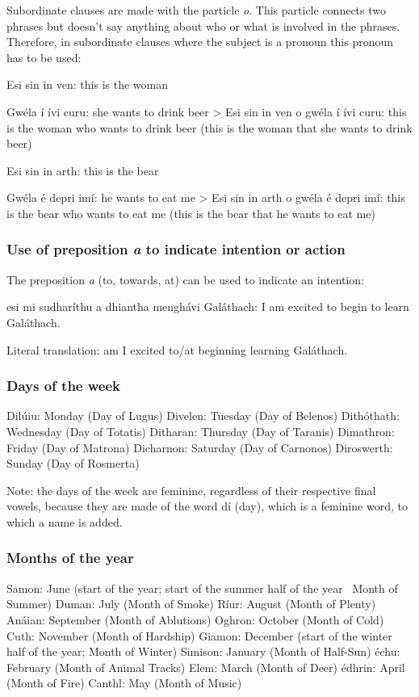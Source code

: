Subordinate clauses are made with the particle \textit{o}. This particle connects two phrases but doesn't say anything about who or what is involved in the phrases. Therefore, in subordinate clauses where the subject is a pronoun this pronoun has to be used:

Esi sin in ven: this is the woman

Gw\'{e}la \'{i} \'{i}vi curu: she wants to drink beer
> Esi sin in ven o gw\'{e}la \'{i} \'{i}vi curu: this is the woman who wants to drink beer (this is the woman that she wants to drink beer)

Esi sin in arth: this is the bear

Gw\'{e}la \'{e} depri im\'{i}: he wants to eat me
> Esi sin in arth o gw\'{e}la \'{e} depri im\'{i}: this is the bear who wants to eat me (this is the bear that he wants to eat me)

\subsubsection{Use of preposition \textit{a} to indicate intention or action}

The preposition \textit{a} (to, towards, at) can be used to indicate an intention:

esi mi sudhar\'{i}thu a dhiantha mengh\'{a}vi Gal\'{a}thach: I am excited to begin to learn Gal\'{a}thach.

Literal translation: am I excited to/at beginning learning Gal\'{a}thach.

\subsubsection{Days of the week}

Dil\'{u}iu: Monday (Day of Lugus)
Divelen: Tuesday (Day of Belenos)
Dith\'{o}thath: Wednesday (Day of Totatis)
Ditharan: Thursday (Day of Taranis)
Dimathron: Friday (Day of Matrona)
Dicharnon: Saturday (Day of Carnonos)
Diroswerth: Sunday (Day of Rosmerta)

Note: the days of the week are feminine, regardless of their respective final vowels, because they are made of the word d\'{i} (day), which is a feminine word, to which a name is added.

\subsubsection{Months of the year}

Samon: June (start of the year; start of the summer half of the year \textendash\ Month of Summer)
Duman: July (Month of Smoke)
R\'{i}ur: August (Month of Plenty)
An\'{a}ian: September (Month of Ablutions)
Oghron: October (Month of Cold)
Cuth: November (Month of Hardship)
Giamon: December (start of the winter half of the year; Month of Winter)
Simison: January (Month of Half-Sun)
\'{e}chu: February (Month of Animal Tracks)
Elem: March (Month of Deer)
\'{e}dhrin: April (Month of Fire)
Canthl: May (Month of Music)

